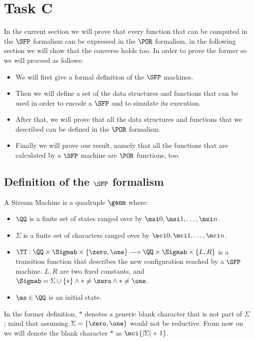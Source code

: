 \section{Task C}

In the current section we will prove that every function that can be computed in the $\SFP$ formalism can be expressed in the $\POR$ formalism, in the following section we will show that the converse holds too. In order to prove the former so we will proceed as follows:

\begin{itemize}
\item We will first give a formal definition of the $\SFP$ machines.
\item Then we will define a set of the data structures and functions that can be used in order to encode a $\SFP$ and to simulate its execution.
\item After that, we will prove that all the data structures and functions that we described can be defined in the $\POR$ formalism.
\item Finally we will prove our result, namely that all the functions that are calculated by a $\SFP$ machine are $\POR$ functions, too.
\end{itemize}

\subsection{Definition of the $\SFP$ formalism}

\begin{defn}
A Stream Machine is a quadruple $\genm$ where:
\begin{itemize}
\item $\QQ$ is a finite set of states ranged over by $\msi 0,  \msi 1, \ldots, \msi n$.
\item $\Sigma$ is a finite set of characters ranged over by $\mci 0,  \mci 1, \ldots, \mci n$.
\item $\TT : \QQ \times \Sigmab  \times \{\zero, \one\} \longrightarrow \QQ \times \Sigmab \times \{L, R\}$ is a transition function that describes the new configuration reached by a $\SFP$ machine. $L, R$ are two fixed constants, and $\Sigmab =\Sigma \cup \{*\} \land *\neq \zero \land * \neq \one$.
\item $\ms \in \QQ$ is an initial state.
\end{itemize}
\end{defn}

In the former definition, $*$ denotes a generic blank character that is not part of $\Sigma$; mind that assuming $\Sigma = \{\zero, \one\}$ would not be reductive. From now on we will denote the blank character $*$ as $\mci{|\Sigma|+1}$.


